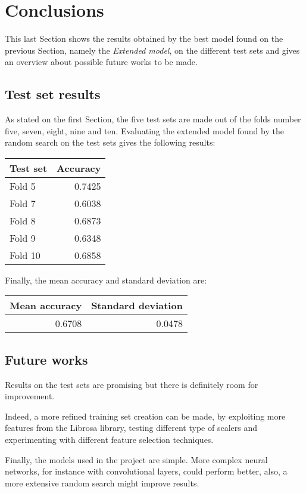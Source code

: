 \section{Conclusions}
\label{results}

This last Section shows the results obtained by the best model found 
on the previous Section, namely the \emph{Extended model}, on the different test sets and
gives an overview about possible future works to be made.

\subsection{Test set results}
As stated on the first Section, the five test sets are made out of the 
folds number five, seven, eight, nine and ten.
Evaluating the extended model found by the random search on the test sets 
gives the following results: 

\begin{center}
    \begin{tabular}{ |l|r| } 
        \hline
        Test set & Accuracy\\
        \hline
        Fold 5 & 0.7425 \\
        Fold 7 & 0.6038 \\
        Fold 8 & 0.6873 \\
        Fold 9 & 0.6348 \\
        Fold 10 & 0.6858 \\ 
        \hline
    \end{tabular}
\end{center}

Finally, the mean accuracy and standard deviation are: 
\begin{center}
    \begin{tabular}{ |r|r| } 
        \hline
        Mean accuracy & Standard deviation\\
        \hline
        0.6708 & 0.0478 \\
        \hline
    \end{tabular}
\end{center}

\subsection{Future works}

Results on the test sets are promising but there is definitely 
room for improvement.

Indeed, a more refined training set creation can be made, by exploiting 
more features from the Librosa library, testing different type 
of scalers and experimenting with different feature selection 
techniques.

Finally, the models used in the project are simple. More complex 
neural networks, for instance with convolutional layers, could 
perform better, also, a more extensive random search might improve
results.